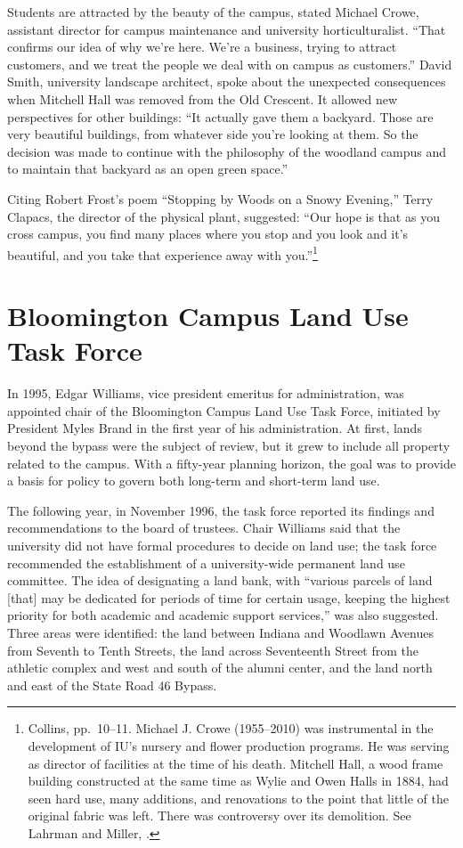 \documentclass[
  american,
  letterpaper,
]{scrreprt}
\begin{document}
Students are attracted by the beauty of the campus, stated Michael
Crowe, assistant director for campus maintenance and university
horticulturalist. ``That confirms our idea of why we're here. We're a
business, trying to attract customers, and we treat the people we deal
with on campus as customers.'' David Smith, university landscape
architect, spoke about the unexpected consequences when Mitchell Hall
was removed from the Old Crescent. It allowed new perspectives for other
buildings: ``It actually gave them a backyard. Those are very beautiful
buildings, from whatever side you're looking at them. So the decision
was made to continue with the philosophy of the woodland campus and to
maintain that backyard as an open green space.''

Citing Robert Frost's poem ``Stopping by Woods on a Snowy Evening,''
Terry Clapacs, the director of the physical plant, suggested: ``Our hope
is that as you cross campus, you find many places where you stop and you
look and it's beautiful, and you take that experience away with
you.''\footnote{Collins{}, pp.~10--11. Michael J. Crowe (1955--2010) was
  instrumental in the development of IU's nursery and flower production
  programs. He was serving as director of facilities at the time of his
  death. Mitchell Hall, a wood frame building constructed at the same
  time as Wylie and Owen Halls in 1884, had seen hard use, many
  additions, and renovations to the point that little of the original
  fabric was left. There was controversy over its demolition. See
  Lahrman and Miller, .}

\section{Bloomington Campus Land Use Task
Force}\label{bloomington-campus-land-use-task-force}

In 1995, Edgar Williams, vice president emeritus for administration, was
appointed chair of the Bloomington Campus Land Use Task Force, initiated
by President Myles Brand in the first year of his administration. At
first, lands beyond the bypass were the subject of review, but it grew
to include all property related to the campus. With a fifty-year
planning horizon, the goal was to provide a basis for policy to govern
both long-term and short-term land use.

The following year, in November 1996, the task force reported its
findings and recommendations to the board of trustees. Chair Williams
said that the university did not have formal procedures to decide on
land use; the task force recommended the establishment of a
university-wide permanent land use committee. The idea of designating a
land bank, with ``various parcels of land {[}that{]} may be dedicated
for periods of time for certain usage, keeping the highest priority for
both academic and academic support services,'' was also suggested. Three
areas were identified: the land between Indiana and Woodlawn Avenues
from Seventh to Tenth Streets, the land across Seventeenth Street from
the athletic complex and west and south of the alumni center, and the
land north and east of the State Road 46 Bypass.
\end{document}
